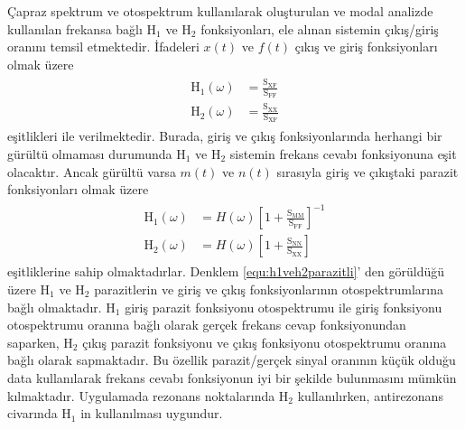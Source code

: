 \documentclass[turkish]{report}
\begin{document}
Çapraz spektrum ve otospektrum kullanılarak oluşturulan ve modal analizde kullanılan frekansa bağlı $\mathrm{H_1}$ ve $\mathrm{\mathrm{H_2}}$ fonksiyonları, ele alınan sistemin çıkış/giriş oranını temsil etmektedir. İfadeleri $x\left(t\right)$ ve $f\left(t\right)$ çıkış ve giriş fonksiyonları olmak üzere
\begin{eqnarray}
\begin{split}
\mathrm{H_1}\left(\omega \right)&=\frac{\mathrm{S_{XF}}}{\mathrm{S_{FF}}}\\
\mathrm{H_2}\left(\omega \right)&=\frac{\mathrm{S_{XX}}}{\mathrm{S_{XF}}}
\end{split}
\end{eqnarray}
eşitlikleri ile verilmektedir. Burada, giriş ve çıkış fonksiyonlarında herhangi bir gürültü olmaması durumunda $\mathrm{H_1}$ ve $\mathrm{H_2}$ sistemin frekans cevabı fonksiyonuna eşit olacaktır. Ancak gürültü varsa $m\left(t\right)$ ve $n\left(t\right)$ sırasıyla giriş ve çıkıştaki parazit fonksiyonları olmak üzere
\begin{eqnarray}
\begin{split}
\mathrm{H_1}\left(\omega \right) &= H\left(\omega \right)\left[1+\frac{\mathrm{S_{MM}}}{\mathrm{S_{FF}}}\right]^{-1}\\
\mathrm{H_2}\left(\omega \right) &= H\left(\omega\right)\left[1+\frac{\mathrm{S_{NN}}}{\mathrm{S_{XX}}}\right]
\end{split}
\label{equ:h1veh2parazitli}
\end{eqnarray}
eşitliklerine sahip olmaktadırlar. Denklem \ref{equ:h1veh2parazitli}' den görüldüğü üzere $\mathrm{H_1}$ ve $\mathrm{H_2}$ parazitlerin ve giriş ve çıkış fonksiyonlarının otospektrumlarına bağlı olmaktadır. $\mathrm{H_1}$ giriş parazit fonksiyonu otospektrumu ile giriş fonksiyonu otospektrumu oranına bağlı olarak gerçek frekans cevap fonksiyonundan saparken, $\mathrm{H_2}$ çıkış parazit fonksiyonu ve çıkış fonksiyonu otospektrumu oranına bağlı olarak sapmaktadır. Bu özellik parazit/gerçek sinyal oranının küçük olduğu data kullanılarak frekans cevabı fonksiyonun iyi bir şekilde bulunmasını mümkün kılmaktadır. Uygulamada rezonans noktalarında $\mathrm{H_2}$ kullanılırken, antirezonans civarında $\mathrm{H_1}$ in kullanılması uygundur.


\end{document}
